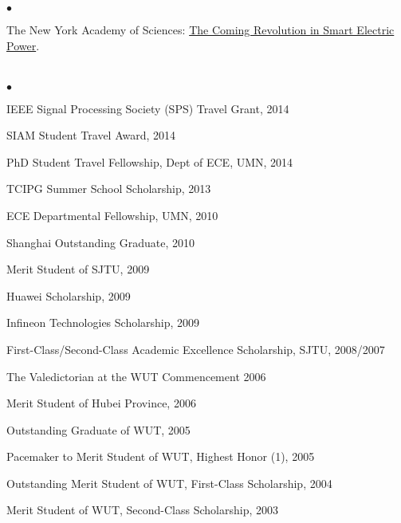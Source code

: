 \documentclass[margin,line]{res}
\newenvironment{list2}{
  \begin{list}{$\bullet$}{%
      \setlength{\itemsep}{0in}
      \setlength{\parsep}{0in} \setlength{\parskip}{0in}
      \setlength{\topsep}{0in} \setlength{\partopsep}{0in}
      \setlength{\leftmargin}{0.10in}}}{\end{list}}
\begin{document}
\begin{resume}
\section{}
\begin{list2}

\item  The New York Academy of Sciences: \href{https://www.nyas.org/magazines/imagining-the-next-100-years/imagining-the-next-100-years-of-science-and-technology/}{The Coming Revolution in Smart Electric Power}.

\end{list2}

\vspace{.3cm}



\section{}
\begin{list2}
\item IEEE Signal Processing Society (SPS) Travel Grant, 2014
\item SIAM Student Travel Award, 2014
\item PhD Student Travel Fellowship, Dept of ECE, UMN, 2014	
\item	TCIPG Summer School Scholarship, 2013
\item	ECE Departmental Fellowship, UMN, 2010
\item	Shanghai Outstanding Graduate, 2010
\item	Merit Student of SJTU, 2009
\item	Huawei Scholarship, 2009
\item	Infineon Technologies Scholarship, 2009
\item	First-Class/Second-Class Academic Excellence Scholarship, SJTU, 2008/2007
\item	The Valedictorian at the WUT Commencement 2006
\item	Merit Student of Hubei Province, 2006
\item	Outstanding Graduate of WUT, 2005
\item	Pacemaker to Merit Student of WUT, Highest Honor (1\textperthousand), 2005
\item	Outstanding Merit Student of WUT, First-Class Scholarship, 2004
\item	Merit Student of WUT, Second-Class Scholarship, 2003
\end{list2}


\end{resume}
\end{document}
